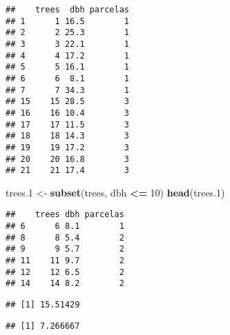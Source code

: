 \documentclass[
]{article}
\newenvironment{Shaded}{\begin{snugshade}}{\end{snugshade}}
\newcommand{\CommentTok}[1]{\textcolor[rgb]{0.56,0.35,0.01}{\textit{#1}}}
\newcommand{\DecValTok}[1]{\textcolor[rgb]{0.00,0.00,0.81}{#1}}
\newcommand{\DocumentationTok}[1]{\textcolor[rgb]{0.56,0.35,0.01}{\textbf{\textit{#1}}}}
\newcommand{\FloatTok}[1]{\textcolor[rgb]{0.00,0.00,0.81}{#1}}
\newcommand{\FunctionTok}[1]{\textcolor[rgb]{0.13,0.29,0.53}{\textbf{#1}}}
\newcommand{\NormalTok}[1]{#1}
\newcommand{\OtherTok}[1]{\textcolor[rgb]{0.56,0.35,0.01}{#1}}
\newcommand{\SpecialCharTok}[1]{\textcolor[rgb]{0.81,0.36,0.00}{\textbf{#1}}}
\newcommand{\StringTok}[1]{\textcolor[rgb]{0.31,0.60,0.02}{#1}}
\begin{document}
\begin{verbatim}
##    trees  dbh parcelas
## 1      1 16.5        1
## 2      2 25.3        1
## 3      3 22.1        1
## 4      4 17.2        1
## 5      5 16.1        1
## 6      6  8.1        1
## 7      7 34.3        1
## 15    15 28.5        3
## 16    16 10.4        3
## 17    17 11.5        3
## 18    18 14.3        3
## 19    19 17.2        3
## 20    20 16.8        3
## 21    21 17.4        3
\end{verbatim}

\begin{Shaded}
\begin{Highlighting}[]
\NormalTok{trees}\FloatTok{.1} \OtherTok{\textless{}{-}} \FunctionTok{subset}\NormalTok{(trees, dbh }\SpecialCharTok{\textless{}=} \DecValTok{10}\NormalTok{)}
\FunctionTok{head}\NormalTok{(trees}\FloatTok{.1}\NormalTok{)}
\end{Highlighting}
\end{Shaded}

\begin{verbatim}
##    trees dbh parcelas
## 6      6 8.1        1
## 8      8 5.4        2
## 9      9 5.7        2
## 11    11 9.7        2
## 12    12 6.5        2
## 14    14 8.2        2
\end{verbatim}

\begin{Shaded}
\end{Shaded}

\begin{verbatim}
## [1] 15.51429
\end{verbatim}

\begin{Shaded}
\end{Shaded}

\begin{verbatim}
## [1] 7.266667
\end{verbatim}

\begin{Shaded}
\end{Shaded}
\end{document}
